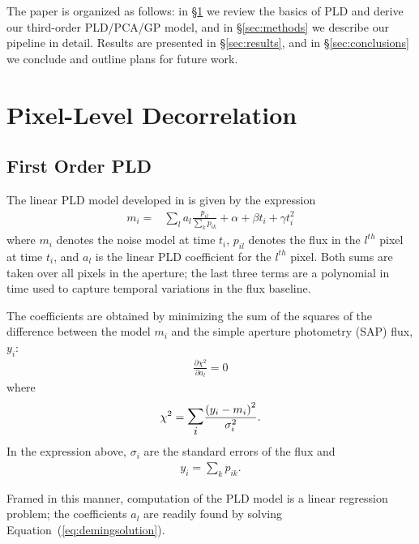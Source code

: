 \documentclass[]{emulateapj}
\begin{document}
The paper is organized as follows: in \S\ref{sec:pld} we review the basics of PLD and
derive our third-order PLD/PCA/GP model, and in \S\ref{sec:methods} we describe our pipeline
in detail. Results are presented in \S\ref{sec:results}, and in \S\ref{sec:conclusions}
we conclude and outline plans for future work.

\section{Pixel-Level Decorrelation}
\label{sec:pld}
\subsection{First Order PLD}
\label{sec:firstorder}
The linear PLD model developed in \cite{DEM15} is given by the expression
\begin{align}
\label{eq:demingmodel}
m_i = &\sum\limits_{l}a_l\frac{p_{il}}{\sum\limits_{k}p_{ik}} + \alpha + \beta t_i + \gamma t_i^2
\end{align}
where $m_i$ denotes the noise model at time $t_i$,
$p_{il}$ denotes the flux in the $l^{th}$ pixel at time $t_i$, and $a_l$ is
the linear PLD coefficient for the $l^{th}$ pixel. Both sums are taken over
all pixels in the aperture; the last three terms are a polynomial in time used
to capture temporal variations in the flux baseline.

The coefficients are obtained by minimizing the sum of the squares of the difference
between the model $m_i$ and the simple aperture photometry (SAP) flux, $y_i$:
\begin{align}
\label{eq:demingsolution}
\frac{\partial \chi^2}{\partial a_l} = 0
\end{align}
where
\begin{align}
\label{eq:demingchisq}
\chi^2 = \mathlarger{\mathlarger{\sum\limits_{i}}}\frac{\left(y_i - m_i\right)^2}{\sigma_i^2}.
\end{align}
In the expression above, $\sigma_i$ are the standard errors of the flux and
\begin{align}
\label{eq:demingsap}
y_i = \sum\limits_{k}p_{ik}.
\end{align}

Framed in this manner, computation of the PLD model is a linear regression problem; the
coefficients $a_l$ are readily found by solving Equation~(\ref{eq:demingsolution}).
%
\end{document}
